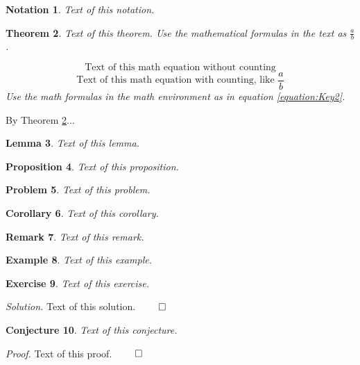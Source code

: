 \documentclass[a4paper,12pt]{article}
\newtheorem{theorem}{Theorem}[section]
\newtheorem{notation}[theorem]{Notation}
\newtheorem{lemma}[theorem]{Lemma}
\newtheorem{proposition}[theorem]{Proposition}%
\newtheorem{problem}[theorem]{Problem}%
\newtheorem{corollary}[theorem]{Corollary}%
\newtheorem{remark}[theorem]{Remark}%
\newtheorem{example}[theorem]{Example}%
\newtheorem{exercise}[theorem]{Exercise}%
\newtheorem{conjecture}[theorem]{Conjecture}%
\renewenvironment{proof}[1][]{\noindent\textit{Proof.} }{$\qed$}
\newenvironment{solution}[1][]{\noindent\textit{Solution.} }{$\qed$}
\begin{document}
\begin{notation}
Text of this notation.
\end{notation}

\begin{theorem}\label{theorem:Key1}
Text of this theorem. Use the mathematical formulas in the text as $\frac{a}{b}$. 
\par 
\[
\text{Text of this math equation without counting}
\]
\begin{equation}\label{equation:Key2}
\text{Text of this math equation with counting, like } \dfrac{a}{b}
\end{equation}
Use the math formulas in the math environment as in equation \ref{equation:Key2}. 
\end{theorem}

\par By Theorem \ref{theorem:Key1}...

\begin{lemma}
Text of this lemma.
\end{lemma}

\begin{proposition}
Text of this proposition.
\end{proposition}

\begin{problem}
Text of this problem.
\end{problem}

\begin{corollary}
Text of this corollary.
\end{corollary}

\begin{remark}
Text of this remark.
\end{remark}

\begin{example}
Text of this example.
\end{example}

\begin{exercise}
Text of this exercise.
\end{exercise}

\begin{solution}
Text of this solution.
\end{solution}

\begin{conjecture}
Text of this conjecture.
\end{conjecture}

\begin{proof}
Text of this proof.
\end{proof}
\end{document}
